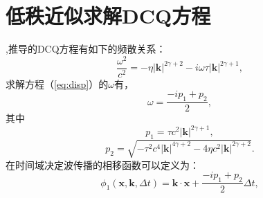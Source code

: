
\appendix	%
\renewcommand\theequation{\Alph{chapter}--\arabic{equation}}	
\renewcommand\thefigure{\Alph{chapter}--\arabic{figure}}
\renewcommand\thetable{\Alph{chapter}--\arabic{table}}

\chapter{低秩近似求解DCQ方程}
,推导的DCQ方程有如下的频散关系：
\begin{equation}
    \frac{\omega^2}{c^2}=-\eta|\mathbf{k}|^{2\gamma+2}-i\omega\tau|\mathbf{k}|^{2\gamma+1},
	\label{eq:disp}
\end{equation}
求解方程（\ref{eq:disp}）的$\omega$有，
\begin{equation}
	\omega=\frac{-ip_1+p_2}{2},
\end{equation}
其中
\begin{equation}
	p_1=\tau c^2|\mathbf{k}|^{2\gamma+1},
\end{equation}
\begin{equation}
	p_2=\sqrt{-\tau^2c^4|\mathbf{k}|^{4\gamma+2}-4\eta c^2|\mathbf{k}|^{2\gamma+2}}.
\end{equation}
在时间域决定波传播的相移函数可以定义为：
\begin{equation}
	\phi_1(\mathbf{x},\mathbf{k},\Delta t)=\mathbf{k}\cdot\mathbf{x}+\frac{-ip_1+p_2}{2}\Delta t,
	\label{eq:phase_func}
\end{equation}

